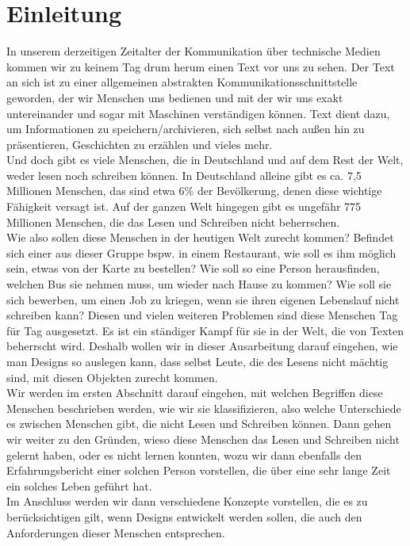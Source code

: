 \section{Einleitung}



In unserem derzeitigen Zeitalter der Kommunikation über technische Medien kommen wir zu keinem Tag drum herum einen Text vor uns zu sehen. Der Text an sich ist zu einer allgemeinen abstrakten Kommunikationsschnittstelle geworden, der wir Menschen uns bedienen und mit der wir uns exakt untereinander und sogar mit Maschinen verständigen können. Text dient dazu, um Informationen zu speichern/archivieren, sich selbst nach außen hin zu präsentieren, Geschichten zu erzählen und vieles mehr.\\


Und doch gibt es viele Menschen, die in Deutschland und auf dem Rest der Welt, weder lesen noch schreiben können. In Deutschland alleine gibt es ca. 7,5 Millionen Menschen, das sind etwa 6\% der Bevölkerung, denen diese wichtige Fähigkeit versagt ist. Auf der ganzen Welt hingegen gibt es ungefähr 775 Millionen Menschen, die das Lesen und Schreiben nicht beherrschen. \\


 Wie also sollen diese Menschen in der heutigen Welt zurecht kommen? Befindet sich einer aus dieser Gruppe bspw. in einem Restaurant, wie soll es ihm möglich sein, etwas von der Karte zu bestellen? Wie soll so eine Person herausfinden, welchen Bus sie nehmen muss, um wieder nach Hause zu kommen? Wie soll sie sich bewerben, um einen Job zu kriegen, wenn sie ihren eigenen Lebenslauf nicht schreiben kann? Diesen und vielen weiteren Problemen sind diese Menschen Tag für Tag ausgesetzt. Es ist ein ständiger Kampf für sie in der Welt, die von Texten beherrscht wird. Deshalb wollen wir in dieser Ausarbeitung darauf eingehen, wie man Designs so auslegen kann, dass selbst Leute, die des Lesens nicht mächtig sind, mit diesen Objekten zurecht kommen.\\
 Wir werden im ersten Abschnitt darauf eingehen, mit welchen Begriffen diese Menschen beschrieben werden, wie wir sie klassifizieren, also welche Unterschiede es zwischen Menschen gibt, die nicht Lesen und Schreiben können. Dann gehen wir weiter zu den Gründen, wieso diese Menschen das Lesen und Schreiben nicht gelernt haben, oder es nicht lernen konnten, wozu wir dann ebenfalls den Erfahrungsbericht einer solchen Person vorstellen, die über eine sehr lange Zeit ein solches Leben geführt hat.\\
 Im Anschluss werden wir dann verschiedene Konzepte vorstellen, die es zu berücksichtigen gilt, wenn Designs entwickelt werden sollen, die auch den Anforderungen dieser Menschen entsprechen.


